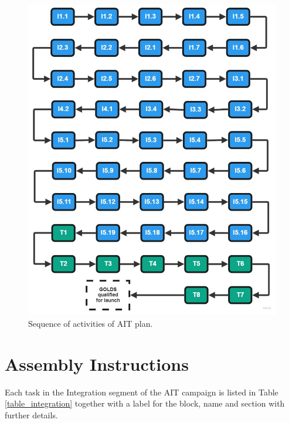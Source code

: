 \begin{figure}[!htb]
\centering
\includegraphics[scale=0.45]{figures/Assembly and Tests chart.pdf}
\caption{Sequence of activities of AIT plan.}
\label{fig:sequence}
\end{figure}

\section{Assembly Instructions}
Each task in the Integration segment of the AIT campaign is listed in Table \ref{table_integration} together with a label for the block, name and section with further details. %



